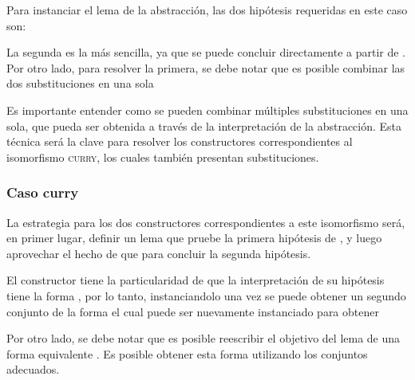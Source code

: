Para instanciar el lema de la abstracción, las dos hipótesis requeridas en este caso son:

\snstar
{}

\snstar
\subst
{\cons
	{\const{[}  \const{]≡} }
	{}}
{}

La segunda es la más sencilla, ya que se puede concluir directamente a partir de .
Por otro lado, para resolver la primera, se debe notar que es posible combinar las dos substituciones en una sola 
\subst
{\cons
	{\const{[}  \const{]≡} }
	{\parens{\comp{\ids}{\bound{$\rho$}}}}}
{}


Es importante entender como se pueden combinar múltiples substituciones en una sola, que pueda ser obtenida a través de la interpretación de la abstracción.
Esta técnica será la clave para resolver los constructores correspondientes al isomorfismo \textsc{curry}, los cuales también presentan substituciones.

\subsubsection{Caso curry}

La estrategia para los dos constructores correspondientes a este isomorfismo será, en primer lugar, definir un lema que pruebe la primera hipótesis de , y luego aprovechar el hecho de que
  
para concluir la segunda hipótesis.

El constructor  tiene la particularidad de que la interpretación de su hipótesis tiene la forma 
, por lo tanto, instanciandolo una vez se puede obtener un segundo conjunto de la forma
el cual puede ser nuevamente instanciado para obtener

Por otro lado, se debe notar que es posible reescribir el objetivo del lema de una forma equivalente
\subst
{}
{}.
Es posible obtener esta forma utilizando los conjuntos adecuados.

